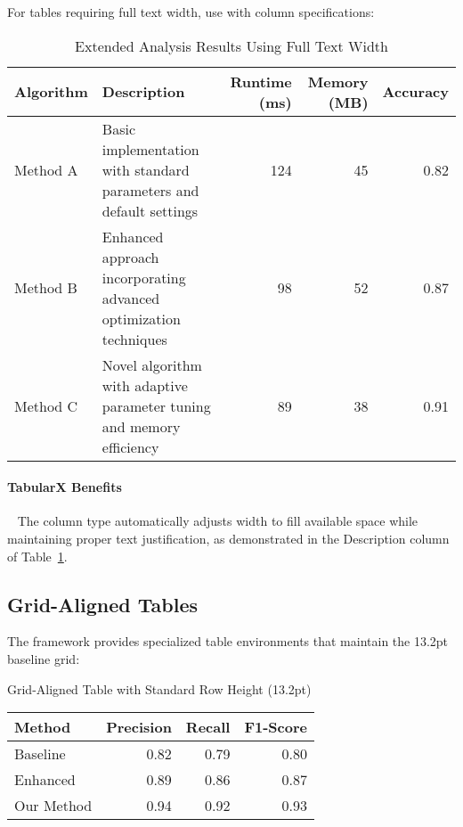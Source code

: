 \documentclass[11pt]{article}
\begin{document}
For tables requiring full text width, use  with  column specifications:

\begin{table}[tbp]
  \caption{Extended Analysis Results Using Full Text Width}
  \label{tab:extended-results}
  \centering
  \begin{tabularx}{\textwidth}{@{}lXrrr@{}}
    \toprule
    Algorithm & Description & Runtime (ms) & Memory (MB) & Accuracy \\
    \midrule
    Method A & Basic implementation with standard parameters and default settings & 124 & 45 & 0.82 \\
    Method B & Enhanced approach incorporating advanced optimization techniques & 98 & 52 & 0.87 \\
    Method C & Novel algorithm with adaptive parameter tuning and memory efficiency & 89 & 38 & 0.91 \\
    \bottomrule
  \end{tabularx}
  \begin{tablenotes}
  \end{tablenotes}
\end{table}

\paragraph{TabularX Benefits}~ The  column type automatically adjusts width to fill available space while maintaining proper text justification, as demonstrated in the Description column of Table~\ref{tab:extended-results}.

\subsection{Grid-Aligned Tables}

The framework provides specialized table environments that maintain the 13.2pt baseline grid:

\begin{gridtable}[tbp]
  \caption{Grid-Aligned Table with Standard Row Height (13.2pt)}
  \label{tab:grid-example}
  \centering
  \begin{tabular}{@{}lrrr@{}}
    \toprule
    Method & Precision & Recall & F1-Score \\
    \midrule
    Baseline & 0.82 & 0.79 & 0.80 \\
    Enhanced & 0.89 & 0.86 & 0.87 \\
    Our Method & 0.94 & 0.92 & 0.93 \\
    \bottomrule
  \end{tabular}
\end{gridtable}
\end{document}

